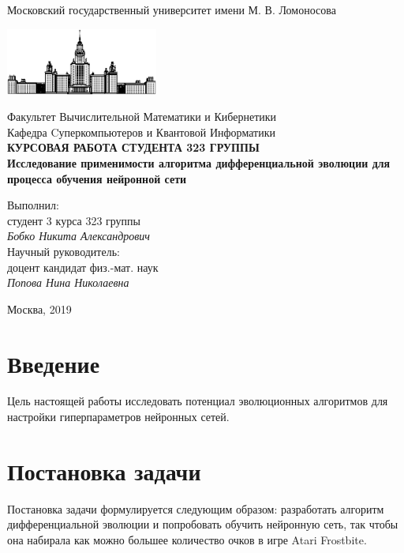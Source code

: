 \documentclass[12pt]{article}
\begin{document}
\begin{titlepage}
\begin{center}
    Московский государственный университет имени М. В. Ломоносова

    \bigskip
    \includegraphics[width=50mm]{msu.eps}

    \bigskip
    Факультет Вычислительной Математики и Кибернетики\\
    Кафедра Cуперкомпьютеров и Квантовой Информатики\\[10mm]

    \textsf{\large\bfseries
        КУРСОВАЯ РАБОТА СТУДЕНТА 323 ГРУППЫ\\[10mm]
        Исследование применимости алгоритма дифференциальной эволюции для процесса обучения нейронной сети
    }\\[10mm]

    \begin{flushright}
        \parbox{0.5\textwidth}{
            Выполнил:\\
            студент 3 курса 323 группы\\
            \emph{Бобко Никита Александрович}\\[5mm]
            Научный руководитель:\\
            доцент  кандидат физ.-мат. наук\\
            \emph{Попова Нина Николаевна}
        }
    \end{flushright}

    \vspace{\fill}
    Москва, 2019
\end{center}
\end{titlepage}

\newpage
\tableofcontents
\newpage

\section{Введение}

    Цель настоящей работы исследовать потенциал эволюционных алгоритмов для настройки гиперпараметров нейронных сетей. 

\section{Постановка задачи}
    Постановка задачи формулируется следующим образом: разработать алгоритм дифференциальной эволюции и попробовать обучить нейронную сеть, так чтобы она набирала как можно большее количество очков в игре Atari Frostbite.
\end{document}
